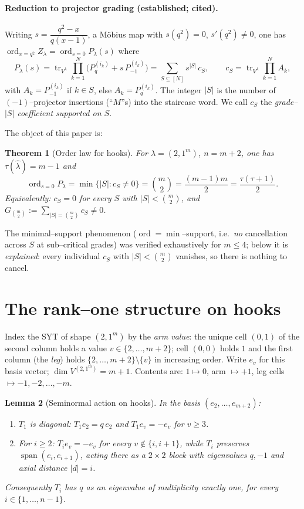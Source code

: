 \documentclass[11pt]{article}
\newtheorem{theorem}{Theorem}
\newtheorem{lemma}[theorem]{Lemma}
\theoremstyle{definition}
\DeclareMathOperator{\tr}{tr}
\DeclareMathOperator{\ord}{ord}
\newcommand{\Pq}{P_{q}}
\newcommand{\Pm}{P_{-1}}
\newcommand{\la}{\lambda}
\begin{document}
\paragraph{Reduction to projector grading (established; cited).}
Writing $s=\dfrac{q^2-x}{q(x-1)}$, a M\"obius map with $s(q^2)=0$, $s'(q^2)\ne0$,
one has $\ord_{x=q^2}Z_\la=\ord_{s=0}P_\la(s)$ where
\[
P_\la(s)=\tr_{V^\la}\prod_{k=1}^N\bigl(\Pq^{(i_k)}+s\,\Pm^{(i_k)}\bigr)
        =\sum_{S\subseteq[N]} s^{|S|}\,c_S,\qquad
c_S=\tr_{V^\la}\prod_{k=1}^N A_k,
\]
with $A_k=\Pm^{(i_k)}$ if $k\in S$, else $A_k=\Pq^{(i_k)}$. The integer $|S|$ is the
number of $(-1)$--projector insertions (``$M$''s) into the staircase word. We call
$c_S$ the \emph{grade--$|S|$ coefficient supported on $S$}.

\medskip
The object of this paper is:

\begin{theorem}[Order law for hooks]\label{thm:main}
For $\la=(2,1^m)$, $n=m+2$, one has
$\tau(\hat\la)=m-1$ and
\[
\ord_{s=0}P_\la=\min\{|S|: c_S\ne0\}=\binom m2=\frac{(m-1)m}{2}=\frac{\tau(\tau+1)}2 .
\]
Equivalently: $c_S=0$ for every $S$ with $|S|<\binom m2$, and
$G_{\binom m2}:=\sum_{|S|=\binom m2}c_S\ne0$.
\end{theorem}

The minimal--support phenomenon ($\ord=\min$--support, i.e.\ \emph{no} cancellation
across $S$ at sub--critical grades) was verified exhaustively for $m\le4$; below it is
\emph{explained}: every individual $c_S$ with $|S|<\binom m2$ vanishes, so there is
nothing to cancel.

\section{The rank--one structure on hooks}

Index the SYT of shape $(2,1^m)$ by the \emph{arm value}: the unique cell $(0,1)$ of
the second column holds a value $v\in\{2,\dots,m+2\}$; cell $(0,0)$ holds $1$ and the
first column (the \emph{leg}) holds $\{2,\dots,m+2\}\setminus\{v\}$ in increasing order.
Write $e_v$ for this basis vector; $\dim V^{(2,1^m)}=m+1$. Contents are: $1\mapsto0$,
arm $\mapsto+1$, leg cells $\mapsto-1,-2,\dots,-m$.

\begin{lemma}[Seminormal action on hooks]\label{lem:action}
In the basis $(e_2,\dots,e_{m+2})$:
\begin{enumerate}
\item[(a)] $T_1$ is diagonal: $T_1 e_2=q\,e_2$ and $T_1 e_v=-e_v$ for $v\ge3$.
\item[(b)] For $i\ge2$: $T_i e_v=-e_v$ for every $v\notin\{i,i+1\}$, while $T_i$
preserves $\operatorname{span}(e_i,e_{i+1})$, acting there as a $2\times2$ block with
eigenvalues $q,-1$ and axial distance $|d|=i$.
\end{enumerate}
Consequently $T_i$ has $q$ as an eigenvalue of multiplicity \emph{exactly one}, for
every $i\in\{1,\dots,n-1\}$.
\end{lemma}
\end{document}
